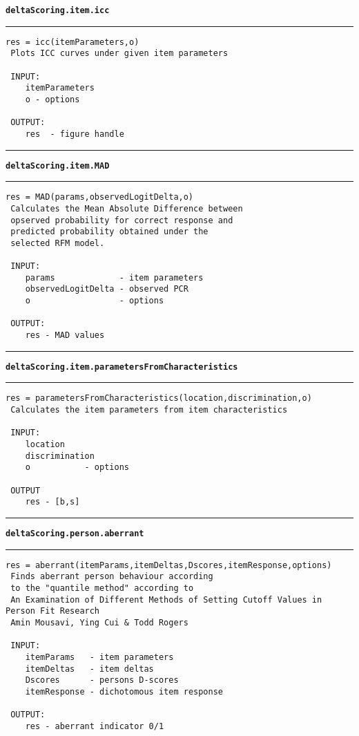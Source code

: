 {\bf\tt deltaScoring.item.icc}
\par\noindent\rule{\textwidth}{0.4pt}
\begin{lstlisting}[style=Matlab-bw]
 res = icc(itemParameters,o)
 Plots ICC curves under given item parameters

 INPUT: 
	itemParameters
	o - options

 OUTPUT: 
	res  - figure handle
\end{lstlisting}
\par\noindent\rule{\textwidth}{0.4pt}
{\bf\tt deltaScoring.item.MAD}
\par\noindent\rule{\textwidth}{0.4pt}
\begin{lstlisting}[style=Matlab-bw]
 res = MAD(params,observedLogitDelta,o)
 Calculates the Mean Absolute Difference between
 opserved probability for correct response and
 predicted probability obtained under the
 selected RFM model.

 INPUT:
	params             - item parameters
	observedLogitDelta - observed PCR
	o                  - options

 OUTPUT:
 	res - MAD values
\end{lstlisting}
\par\noindent\rule{\textwidth}{0.4pt}
{\bf\tt deltaScoring.item.parametersFromCharacteristics}
\par\noindent\rule{\textwidth}{0.4pt}
\begin{lstlisting}[style=Matlab-bw]
 res = parametersFromCharacteristics(location,discrimination,o)
 Calculates the item parameters from item characteristics

 INPUT:
	location
	discrimination
	o           - options

 OUTPUT
	res - [b,s]
\end{lstlisting}
\par\noindent\rule{\textwidth}{0.4pt}
{\bf\tt deltaScoring.person.aberrant}
\par\noindent\rule{\textwidth}{0.4pt}
\begin{lstlisting}[style=Matlab-bw]
 res = aberrant(itemParams,itemDeltas,Dscores,itemResponse,options)
 Finds aberrant person behaviour according
 to the "quantile method" according to
 An Examination of Different Methods of Setting Cutoff Values in Person Fit Research
 Amin Mousavi, Ying Cui & Todd Rogers

 INPUT:
	itemParams   - item parameters
	itemDeltas   - item deltas
	Dscores      - persons D-scores
	itemResponse - dichotomous item response

 OUTPUT:
	res - aberrant indicator 0/1
\end{lstlisting}

